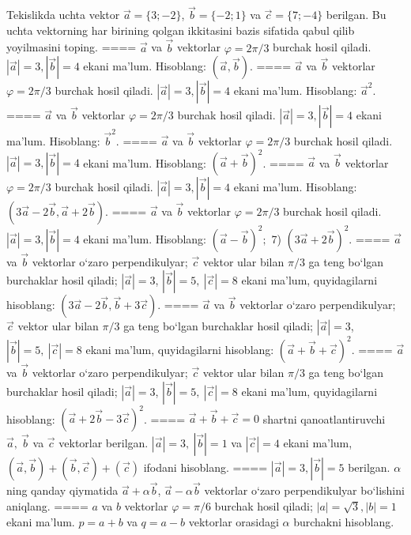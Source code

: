 Tekislikda uchta vektor $\vec{a} = \{ 3; - 2\}$, $\vec{b} = \{ - 2;1\}$ va $\vec{c} = \{ 7; - 4\}$ berilgan. Bu uchta vektorning har birining qolgan ikkitasini bazis sifatida qabul qilib yoyilmasini toping.
====
$\vec{a}$ va $\vec{b}$ vektorlar $\varphi = 2\pi/3$ burchak hosil qiladi. $|\vec{a}| = 3,|\vec{b}| = 4$ ekani ma’lum. Hisoblang:
$\left(\vec{a},\vec{b} \right) $.
====
$\vec{a}$ va $\vec{b}$ vektorlar $\varphi = 2\pi/3$ burchak hosil qiladi. $|\vec{a}| = 3,|\vec{b}| = 4$ ekani ma’lum. Hisoblang:
${\vec{a}}^{2}$.
====
$\vec{a}$ va $\vec{b}$ vektorlar $\varphi = 2\pi/3$ burchak hosil qiladi. $|\vec{a}| = 3,|\vec{b}| = 4$ ekani ma’lum. Hisoblang:
${\vec{b}}^{2}$.
====
$\vec{a}$ va $\vec{b}$ vektorlar $\varphi = 2\pi/3$ burchak hosil qiladi. $|\vec{a}| = 3,|\vec{b}| = 4$ ekani ma’lum. Hisoblang:
$ (\vec{a} + \vec{b}) ^{2}$.
====
$\vec{a}$ va $\vec{b}$ vektorlar $\varphi = 2\pi/3$ burchak hosil qiladi. $|\vec{a}| = 3,|\vec{b}| = 4$ ekani ma’lum. Hisoblang:
$\left(3\vec{a} - 2\vec{b},\vec{a} + 2\vec{b} \right) $.
====
$\vec{a}$ va $\vec{b}$ vektorlar $\varphi = 2\pi/3$ burchak hosil qiladi. $|\vec{a}| = 3,|\vec{b}| = 4$ ekani ma’lum. Hisoblang:
$ (\vec{a} - \vec{b}) ^{2};$ 7) $ (3\vec{a} + 2\vec{b}) ^{2}$.
====
$\vec{a}$ va $\vec{b}$ vektorlar o‘zaro perpendikulyar; $\vec{c}$ vektor ular bilan $\pi/3$ ga teng bo‘lgan burchaklar hosil qiladi; $|\vec{a}| = 3$, $|\vec{b}| = 5,\ |\vec{c}| = 8$ ekani ma’lum, quyidagilarni hisoblang:
$\left(3\vec{a} - 2\vec{b},\vec{b} + 3\vec{c} \right) $.
====
$\vec{a}$ va $\vec{b}$ vektorlar o‘zaro perpendikulyar; $\vec{c}$ vektor ular bilan $\pi/3$ ga teng bo‘lgan burchaklar hosil qiladi; $|\vec{a}| = 3$, $|\vec{b}| = 5,\ |\vec{c}| = 8$ ekani ma’lum, quyidagilarni hisoblang:
$ (\vec{a} + \vec{b} + \vec{c}) ^{2}$.
====
$\vec{a}$ va $\vec{b}$ vektorlar o‘zaro perpendikulyar; $\vec{c}$ vektor ular bilan $\pi/3$ ga teng bo‘lgan burchaklar hosil qiladi; $|\vec{a}| = 3$, $|\vec{b}| = 5,\ |\vec{c}| = 8$ ekani ma’lum, quyidagilarni hisoblang:
$ (\vec{a} + 2\vec{b} - 3\vec{c}) ^{2}$.
====
$\vec{a} + \vec{b} + \vec{c} = 0$ shartni qanoatlantiruvchi $\vec{a},\ \vec{b}$ va $\vec{c}$ vektorlar berilgan. $|\vec{a}| = 3,\ |\vec{b}| = 1$ va $|\vec{c}| = 4$ ekani ma’lum, $\left(\vec{a},\vec{b} \right) + \left(\vec{b},\vec{c} \right) + (\vec{c}) $ ifodani hisoblang.
====
$|\vec{a}| = 3,|\vec{b}| = 5$ berilgan. $\alpha$ ning qanday qiymatida $\vec{a} + \alpha\vec{b}$, $\vec{a} - \alpha\vec{b}$ vektorlar o‘zaro perpendikulyar bo‘lishini aniqlang.
====
$a$ va $b$ vektorlar $\varphi = \pi/6$ burchak hosil qiladi; $|a| = \sqrt{3},|b| = 1$ ekani ma’lum. $p = a + b$ va $q = a - b$ vektorlar orasidagi $\alpha$ burchakni hisoblang.
